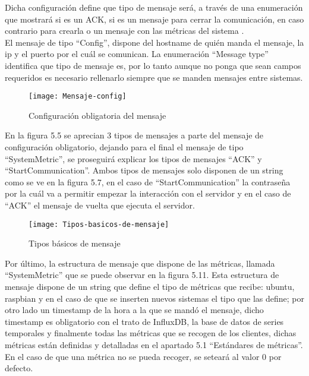 \documentclass[ spanish, a4paper, 12pt, oneside]{report}
\begin{document}
Dicha configuración define que tipo de mensaje será, a través de una enumeración que mostrará si es un ACK, si es un mensaje para cerrar la comunicación, en caso contrario para crearla o un mensaje con las métricas del sistema . \\

El mensaje de tipo ``Config'', dispone del hostname de quién manda el mensaje, la ip y el puerto por el cuál se comunican. La enumeración ``Message type'' identifica que tipo de mensaje es, por lo tanto aunque no ponga 
que sean campos requeridos es necesario rellenarlo siempre que se manden mensajes entre sistemas. \\

\begin{figure}[!h]
   \centering
   \texttt{[image: Mensaje-config]}\\
      \caption{\label{fig: Configuración obligatoria del mensaje} Configuración obligatoria del mensaje}
\end{figure}

En la figura 5.5 se aprecian 3 tipos de mensajes a parte del mensaje de configuración obligatorio, dejando para el final el mensaje de tipo ``SystemMetric'', se proseguirá explicar los tipos de mensajes ``ACK'' y ``StartCommunication''. 
Ambos tipos de mensajes solo disponen de un string como se ve en la figura 5.7, en el caso de ``StartCommunication'' la contraseña por la cuál va a permitir empezar la interacción con el servidor y en el caso de ``ACK'' el mensaje 
de vuelta que ejecuta el servidor. \\

\begin{figure}[!h]
   \centering
   \texttt{[image: Tipos-basicos-de-mensaje]}\\
      \caption{\label{fig: Tipos básicos de mensaje} Tipos básicos de mensaje}
\end{figure}

Por último, la estructura de mensaje que dispone de las métricas, llamada ``SystemMetric'' que se puede observar en la figura 5.11. Esta estructura de mensaje dispone de un string que define el tipo de métricas que recibe: ubuntu, raspbian y 
en el caso de que se inserten nuevos sistemas el tipo que las define; por otro lado un timestamp de la hora a la que se mandó el mensaje, dicho timestamp es obligatorio con el trato de InfluxDB, la base de datos de series temporales y finalmente todas las 
métricas que se recogen de los clientes, dichas métricas están definidas y detalladas en el apartado 5.1 ``Estándares de métricas''. En el caso de que una métrica no se pueda recoger, se seteará al valor 0 por defecto.\\
\end{document}
